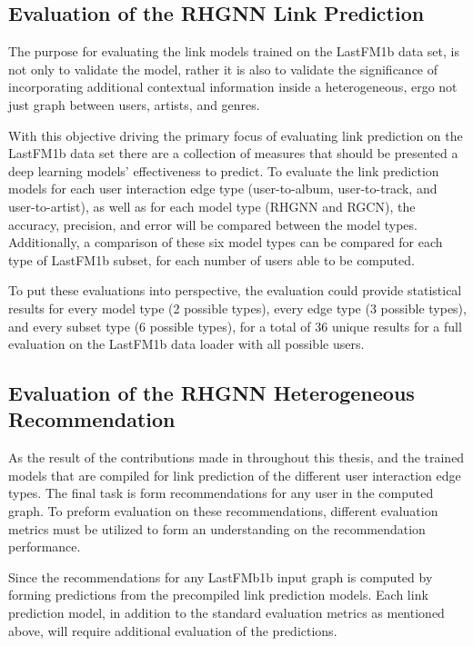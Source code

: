 \subsection{Evaluation of the RHGNN Link Prediction}

The purpose for evaluating the link models trained on the LastFM1b data set, is not only to validate the model, rather it is also to validate the significance of incorporating additional contextual information inside a heterogeneous, ergo not just graph between users, artists, and genres.

With this objective driving the primary focus of evaluating link prediction on the LastFM1b data set there are a collection of measures that should be presented a deep learning models’ effectiveness to predict. To evaluate the link prediction models for each user interaction edge type (user-to-album, user-to-track, and user-to-artist), as well as for each model type (RHGNN and RGCN), the accuracy, precision, and error will be compared between the model types. Additionally, a comparison of these six model types can be compared for each type of LastFM1b subset, for each number of users able to be computed.

To put these evaluations into perspective, the evaluation could provide statistical results for every model type (2 possible types), every edge type (3 possible types), and every subset type (6 possible types), for a total of 36 unique results for a full evaluation on the LastFM1b data loader with all possible users.


\subsection{Evaluation of the RHGNN Heterogeneous Recommendation}

As the result of the contributions made in throughout this thesis, and the trained models that are compiled for link prediction of the different user interaction edge types. The final task is form recommendations for any user in the computed graph. To preform evaluation on these recommendations, different evaluation metrics must be utilized to form an understanding on the recommendation performance. 

Since the recommendations for any LastFMb1b input graph is computed by forming predictions from the precompiled link prediction models. Each link prediction model, in addition to the standard evaluation metrics as mentioned above, will require additional evaluation of the predictions.

